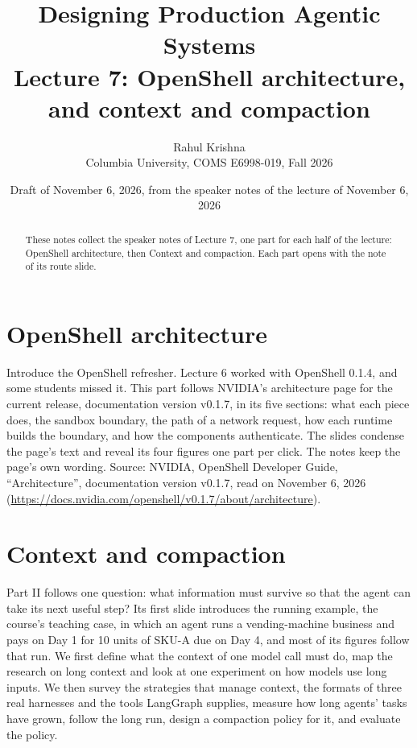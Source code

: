\documentclass[10pt]{extarticle}
\title{Designing Production Agentic Systems\\Lecture 7: OpenShell architecture, and context and compaction}
\author{Rahul Krishna\\Columbia University, COMS E6998-019, Fall 2026}
\date{Draft of November 6, 2026, from the speaker notes of the lecture of November 6, 2026}
\begin{document}
\maketitle
\begin{abstract}
These notes collect the speaker notes of Lecture 7, one part for each half of the lecture: OpenShell architecture, then Context and compaction. Each part opens with the note of its route slide.
\end{abstract}
\tableofcontents

\part{OpenShell architecture}
Introduce the OpenShell refresher. Lecture 6 worked with OpenShell 0.1.4, and some students missed it. This part follows NVIDIA's architecture page for the current release, documentation version v0.1.7, in its five sections: what each piece does, the sandbox boundary, the path of a network request, how each runtime builds the boundary, and how the components authenticate. The slides condense the page's text and reveal its four figures one part per click. The notes keep the page's own wording. Source: NVIDIA, OpenShell Developer Guide, ``Architecture'', documentation version v0.1.7, read on November 6, 2026 (\url{https://docs.nvidia.com/openshell/v0.1.7/about/architecture}).







\part{Context and compaction}
Part II follows one question: what information must survive so that the agent can take its next useful step? Its first slide introduces the running example, the course's teaching case, in which an agent runs a vending-machine business and pays on Day 1 for 10 units of SKU-A due on Day 4, and most of its figures follow that run. We first define what the context of one model call must do, map the research on long context and look at one experiment on how models use long inputs. We then survey the strategies that manage context, the formats of three real harnesses and the tools LangGraph supplies, measure how long agents' tasks have grown, follow the long run, design a compaction policy for it, and evaluate the policy.








\end{document}
